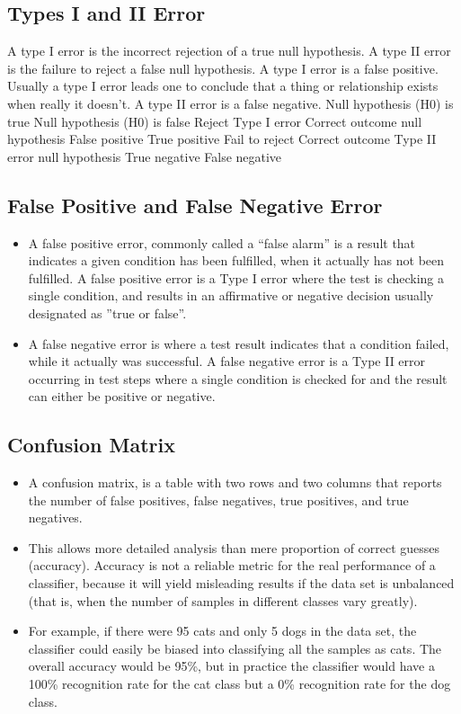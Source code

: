 \documentclass[12pt]{article}
\begin{document}
\subsection*{Types I and II Error}
A type I error is the incorrect rejection of a true null hypothesis. A type
II error is the failure to reject a false null hypothesis. A type I error is a
false positive. Usually a type I error leads one to conclude that a thing or
relationship exists when really it doesn’t. A type II error is a false negative.
Null hypothesis (H0) is true Null hypothesis (H0) is false
Reject Type I error Correct outcome
null hypothesis False positive True positive
Fail to reject Correct outcome Type II error
null hypothesis True negative False negative
\subsection*{False Positive and False Negative Error}

\begin{itemize}
	\item 
	A false positive error, commonly called a “false alarm” is a result that indicates
	a given condition has been fulfilled, when it actually has not been
	fulfilled. A false positive error is a Type I error where the test is checking
	a single condition, and results in an affirmative or negative decision usually
	designated as ”true or false”.
	\item  A false negative error is where a test result indicates that a condition
	failed, while it actually was successful. A false negative error is a Type II
	error occurring in test steps where a single condition is checked for and the
	result can either be positive or negative.
\end{itemize}
\subsection*{Confusion Matrix}
\begin{itemize}
	\item A confusion matrix, is a table with two rows and two columns that reports
	the number of false positives, false negatives, true positives, and true
	negatives.
	\item This allows more detailed analysis than mere proportion of correct guesses
	(accuracy). Accuracy is not a reliable metric for the real performance of a
	classifier, because it will yield misleading results if the data set is unbalanced
	(that is, when the number of samples in different classes vary greatly).
	
	\item For example, if there were 95 cats and only 5 dogs in the data set, the
	classifier could easily be biased into classifying all the samples as cats. The
	overall accuracy would be 95\%, but in practice the classifier would have a
	100\% recognition rate for the cat class but a 0\% recognition rate for the dog
	class.
\end{itemize}
\end{document}
